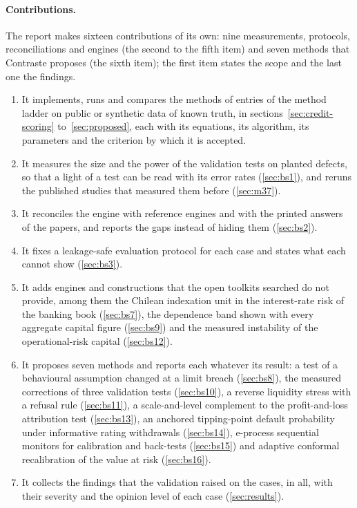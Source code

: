 \paragraph{Contributions.} The report makes sixteen contributions of its own: nine measurements, protocols, reconciliations and engines (the second to the fifth item) and seven methods that Contraste proposes (the sixth item); the first item states the scope and the last one the findings.
\begin{enumerate}
\item It implements, runs and compares the methods of \rsMethodRows{} entries of the method ladder on public or synthetic data of known truth, in sections~\ref{sec:credit-scoring}
to~\ref{sec:proposed}, each with its equations, its algorithm, its parameters and the criterion by which it is accepted.
\item It measures the size and the power of the validation tests on planted defects, so that a light of a test can be read with its error rates
(\cref{sec:bs1}), and reruns the published studies that measured them before (\cref{sec:m37}).
\item It reconciles the engine with reference engines and with the printed answers of the papers, and reports the gaps instead of hiding them (\cref{sec:bs2}).
\item It fixes a leakage-safe evaluation protocol for each case and states what each cannot show (\cref{sec:bs3}).
\item It adds engines and constructions that the open toolkits searched do not provide, among them the Chilean indexation unit in the interest-rate risk of the banking
book (\cref{sec:bs7}), the dependence band shown with every aggregate capital figure (\cref{sec:bs9}) and the measured instability of the operational-risk capital (\cref{sec:bs12}).
\item It proposes seven methods and reports each whatever its result: a test of a behavioural assumption changed at a limit breach (\cref{sec:bs8}), the measured corrections of three validation tests (\cref{sec:bs10}), a reverse liquidity stress with a refusal rule (\cref{sec:bs11}),
a scale-and-level complement to the profit-and-loss attribution test (\cref{sec:bs13}), an anchored tipping-point default probability under informative rating withdrawals (\cref{sec:bs14}), e-process sequential monitors for calibration and back-tests
(\cref{sec:bs15}) and adaptive conformal recalibration of the value at risk (\cref{sec:bs16}).
\item It collects the findings that the validation raised on the \rsCasesResult{} cases, \rsFindTotal{} in all, with their severity and the opinion level of each case
(\cref{sec:results}).
\end{enumerate}

